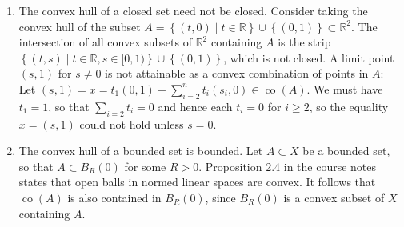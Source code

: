 \documentclass[11pt,leqno]{article}
\theoremstyle{plain}
\theoremstyle{definition}
\numberwithin{equation}{section}
\numberwithin{lem}{section}
\newcommand{\cbr}[1]{\left\{#1\right\}}
\DeclareMathOperator{\co}{co}
\begin{document}
\begin{enumerate}
\begin{enumerate}
    \item The convex hull of a closed set need not be closed.
    Consider taking the convex hull of the subset $A = \cbr{(t,0)\mid t\in \mathbb R}\cup \cbr{(0,1)}\subset \mathbb R^2$. The intersection of all convex subsets of $\mathbb R^2$ containing $A$ is the strip $\cbr{(t,s)\mid t\in\mathbb R, s\in [0,1)}\cup \cbr{(0,1)}$, which is not closed. A limit point $(s,1)$ for $s\neq 0$ is not attainable as a convex combination of points in $A$: Let $(s,1) = x = t_1(0,1) + \sum_{i= 2}^nt_i(s_i,0)\in \co(A)$. We must have $t_1 = 1$, so that $\sum_{i= 2} t_i = 0$ and hence each $t_i = 0$ for $i\geq 2$, so the equality $x = (s,1)$ could not hold unless $s = 0$.
    \item The convex hull of a bounded set is bounded. Let $A\subset X$ be a bounded set, so that $A\subset B_R(0)$ for some $R>0$. Proposition 2.4 in the course notes states that open balls in normed linear spaces are convex. It follows that $\co(A)$ is also contained in $B_R(0)$, since $B_R(0)$ is a convex subset of $X$ containing $A$.
  \end{enumerate}
\end{enumerate}
\end{document}
